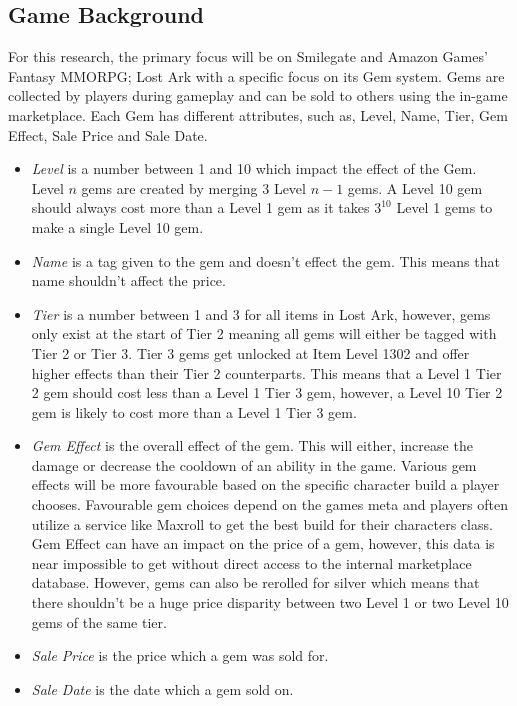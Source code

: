 \documentclass[journal]{IEEEtran}
\begin{document}
\subsection{Game Background}
\noindent For this research, the primary focus will be on Smilegate and Amazon Games' Fantasy MMORPG; Lost Ark\cite{LostArk2019} with a specific focus on its Gem system. Gems are collected by players during gameplay and can be sold to others using the in-game marketplace. Each Gem has different attributes, such as, Level, Name, Tier, Gem Effect, Sale Price and Sale Date.
\begin{itemize}
    \item \textit{Level} is a number between 1 and 10 which impact the effect of the Gem. Level \( n \) gems are created by merging 3 Level  \( n-1 \) gems. A Level 10 gem should always cost more than a Level 1 gem as it takes \( 3^{10} \) Level 1 gems to make a single Level 10 gem.
    \item \textit{Name} is a tag given to the gem and doesn't effect the gem. This means that name shouldn't affect the price.
    \item \textit{Tier} is a number between 1 and 3 for all items in Lost Ark, however, gems only exist at the start of Tier 2 meaning all gems will either be tagged with Tier 2 or Tier 3. Tier 3 gems get unlocked at Item Level 1302 and offer higher effects than their Tier 2 counterparts. This means that a Level 1 Tier 2 gem should cost less than a Level 1 Tier 3 gem, however, a Level 10 Tier 2 gem is likely to cost more than a Level 1 Tier 3 gem.
    \item \textit{Gem Effect} is the overall effect of the gem. This will either, increase the damage or decrease the cooldown of an ability in the game. Various gem effects will be more favourable based on the specific character build a player chooses. Favourable gem choices depend on the games meta and players often utilize a service like Maxroll\cite{Maxroll2022} to get the best build for their characters class. Gem Effect can have an impact on the price of a gem, however, this data is near impossible to get without direct access to the internal marketplace database. However, gems can also be rerolled for silver which means that there shouldn't be a huge price disparity between two Level 1 or two Level 10 gems of the same tier.
    \item \textit{Sale Price} is the price which a gem was sold for.
    \item \textit{Sale Date} is the date which a gem sold on.
\end{itemize}
\end{document}
